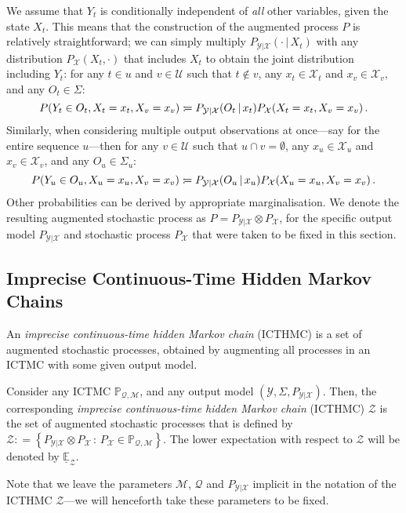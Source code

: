 \documentclass[twoside,11pt]{article}
\newcommand{\states}{\mathcal{X}}
\newcommand{\observs}{\mathcal{Y}}
\newcommand{\rateset}{\mathcal{Q}}
\newcommand{\coloneqq}{:\!=}
\begin{document}
We assume that $Y_t$ is conditionally independent of \emph{all} other variables, given the state $X_t$. This means that the construction of the augmented process $P$ is relatively straightforward; we can simply multiply $P_{\observs\vert\states}(\cdot\,\vert\,X_t)$ with any distribution $P_\states(X_t,\cdot)$ that includes $X_t$ to obtain the joint distribution including $Y_t$: for any $t\in u$ and $v\in\mathcal{U}$ such that $t\notin v$, any $x_t\in\states_t$ and $x_v\in\states_v$, and any $O_t\in\Sigma$:
\vspace{-2pt}
\begin{equation*}
P(Y_t\in O_t,X_t=x_t,X_v=x_v) \coloneqq P_{\observs\vert\states}(O_t\,\vert\,x_t)P_\states(X_t=x_t,X_v=x_v)\,.\vspace{-2pt}
\end{equation*}
Similarly, when considering multiple output observations at once---say for the entire sequence $u$---then for any $v\in\mathcal{U}$ such that $u\cap v=\emptyset$, any $x_u\in\states_u$ and $x_v\in\states_v$, and any $O_u\in\Sigma_u$:
\vspace{-2pt}
\begin{equation*}
P(Y_u\in O_u,X_u=x_u, X_v=x_v) \coloneqq P_{\observs\vert\states}(O_{u}\,\vert\,x_{u})P_\states(X_u=x_u,X_v=x_v)\,.\vspace{-2pt}
\end{equation*}
Other probabilities can be derived by appropriate marginalisation.
We denote the resulting augmented stochastic process as $P=P_{\observs\vert\states}\otimes P_\states$,
for the specific output model $P_{\observs\vert\states}$ and stochastic process $P_\states$ that were taken to be fixed in this section.
\vspace{-8pt}

\subsection{Imprecise Continuous-Time Hidden Markov Chains}\label{subsec:ICTHMC}

An \emph{imprecise continuous-time hidden Markov chain} (ICTHMC) is a set of augmented stochastic processes, obtained by augmenting all processes in an ICTMC with some given output model.
\begin{definition}\label{def:hidden_ictmc}
Consider any ICTMC $\mathbb{P}_{\rateset,\mathcal{M}}$, and any output model $(\observs,\Sigma,P_{\observs\vert\states})$. Then, the corresponding \emph{imprecise continuous-time hidden Markov chain} (ICTHMC) $\mathcal{Z}$ is the set of augmented stochastic processes that is defined by
$\mathcal{Z} \coloneqq \left\{ P_{\observs\vert\states}\otimes P_{\states} \,:\, P_{\states}\in\mathbb{P}_{\rateset,\mathcal{M}}\right\}$.
The lower expectation with respect to $\mathcal{Z}$ will be denoted by $\underline{\mathbb{E}}_\mathcal{Z}$.
\end{definition}
Note that we leave the parameters $\mathcal{M}$, $\rateset$ and $P_{\observs\vert\states}$ implicit in the notation of the ICTHMC $\mathcal{Z}$---we will henceforth take these parameters to be fixed.
\end{document}
